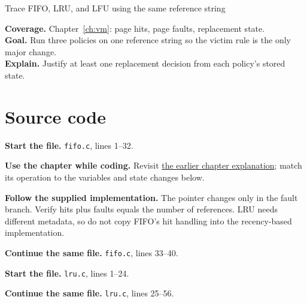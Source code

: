 \begin{labproject}{Trace FIFO, LRU, and LFU using the same reference string}

\textbf{Coverage.} Chapter~\ref{ch:vm}: page hits, page faults, replacement state.\\
\textbf{Goal.} Run three policies on one reference string so the victim rule is the only major change.\\
\textbf{Explain.} Justify at least one replacement decision from each policy's stored state.




\section*{Source code}
\noindent\textbf{Start the file.} \texttt{fifo.c}, lines 1--32.



\textbf{Use the chapter while coding.} Revisit \hyperref[ch:vm]{the earlier chapter explanation}; match its operation to the variables and state changes below.

\textbf{Follow the supplied implementation.} The pointer changes only in the fault branch. Verify hits plus faults equals the number of references. LRU needs different metadata, so do not copy FIFO's hit handling into the recency-based implementation.




\noindent\textbf{Continue the same file.} \texttt{fifo.c}, lines 33--40.


\noindent\textbf{Start the file.} \texttt{lru.c}, lines 1--24.


\noindent\textbf{Continue the same file.} \texttt{lru.c}, lines 25--56.



\end{labproject}
